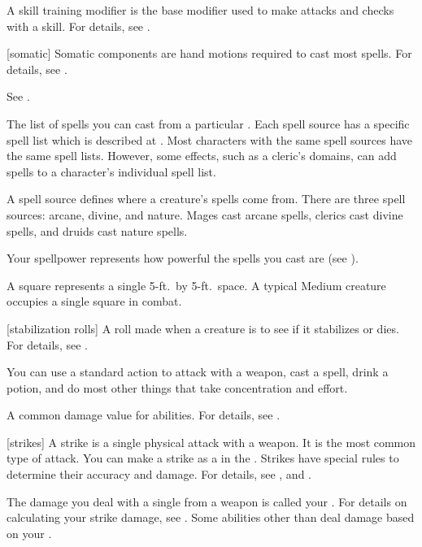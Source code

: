  A skill training modifier is the base modifier used to make attacks and checks with a skill.
For details, see .

[somatic] Somatic components are hand motions required to cast most spells.
For details, see .

 See .

 The list of spells you can cast from a particular .
Each spell source has a specific spell list which is described at .
Most characters with the same spell sources have the same spell lists.
However, some effects, such as a cleric's domains, can add spells to a character's individual spell list.

 A spell source defines where a creature's spells come from.
There are three spell sources: arcane, divine, and nature.
Mages cast arcane spells, clerics cast divine spells, and druids cast nature spells.

 Your spellpower represents how powerful the spells you cast are (see ).

 A square represents a single 5-ft.\ by 5-ft.\ space.
A typical Medium creature occupies a single square in combat.

[stabilization rolls] A roll made when a creature is  to see if it stabilizes or dies. For details, see .

 You can use a standard action to attack with a weapon, cast a spell, drink a potion, and do most other things that take concentration and effort.

 A common damage value for abilities.
For details, see .

[strikes] A strike is a single physical attack with a weapon.
It is the most common type of attack.
You can make a strike as a  in the .
Strikes have special rules to determine their accuracy and damage.
For details, see , and .

 The damage you deal with a single  from a weapon is called your .
For details on calculating your strike damage, see .
Some abilities other than  deal damage based on your .

